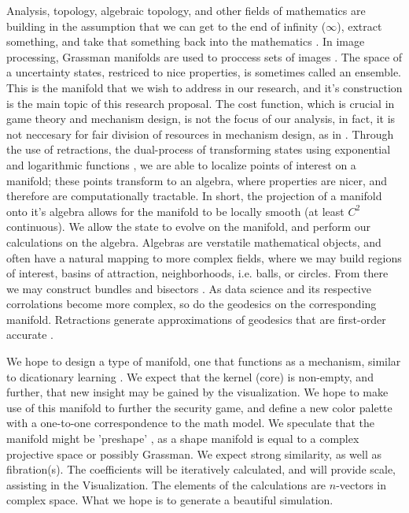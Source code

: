 \documentclass[11pt]{article}
\theoremstyle{definition}
\begin{document}
Analysis, topology, algebraic topology, and other fields of mathematics are building
in
the assumption that we can get to the end of infinity ($\infty$), extract
something, and take that something back into the mathematics \cite{NJ}.
In image processing, Grassman manifolds are used to proccess
sets of images \cite{MIC}. The space of a uncertainty states, restriced to nice
properties, is sometimes called an ensemble. This is the manifold that we wish to
address in our research, and it's construction is the main topic of this research proposal.
The cost function, which is crucial in game theory and mechanism design,
is not the focus of our analysis, in fact, it is not neccesary for fair
division of resources in mechanism design, as in \cite{MECH}. 
Through the use of retractions, the dual-process of transforming states using
exponential and logarithmic functions \cite{RMANI}, 
we are able to localize points of
interest on a manifold; these points transform to an algebra, where
properties are nicer, and therefore are computationally tractable. In
short, the projection of a manifold onto it's algebra allows for the
manifold to be locally smooth (at least $C^2$ continuous). We allow the
state to evolve on the manifold, and perform our calculations on the
algebra. Algebras are verstatile mathematical objects, and often
have a natural mapping to more complex fields, where we may build
regions of interest, basins of attraction, neighborhoods, i.e. balls, or
circles. From there we may construct bundles and bisectors \cite{NJ}. As
data science and its respective corrolations become more complex, so do
the geodesics on the corresponding manifold. Retractions generate approximations
of geodesics that are first-order accurate \cite{RMANI}.

We hope to design a type of manifold, one that functions as a
mechanism, similar to dicationary learning \cite{MIC}. We expect that the kernel
(core) is non-empty, and further, that new insight may be gained by the
visualization. We hope to make use of this manifold to further the security
game, and define a new color palette with a one-to-one correspondence to the
math model. We speculate that the manifold might be 'preshape' \cite{MIC}, as a
shape manifold is equal to a complex projective space or possibly
Grassman. We expect strong similarity, as well as fibration(s). The coefficients
will be iteratively calculated, and will provide scale, assisting in the
Visualization. The elements of the calculations are $n$-vectors in complex
space. What we hope is to generate a beautiful simulation.
\end{document}
